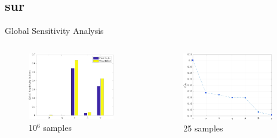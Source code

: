 \documentclass[xcolor={x11names,table},compress,svgnames,mathserif]{beamer}
\renewcommand{\(}{\begin{columns}}
\renewcommand{\)}{\end{columns}}
\newcommand{\<}[1]{\begin{column}{#1}}
\renewcommand{\>}{\end{column}}
\begin{document}

\subsection{sur}

\begin{frame}{Global Sensitivity Analysis}

\begin{columns}
\begin{column}{0.5\textwidth}
\begin{center}
\begin{figure}[htbp]
  \includegraphics[width=0.9\textwidth]{./Figures/PCE5D_gsa}
  \\ \scriptsize{10$^{6}$ samples}
  \end{figure}
\end{center}
\end{column}
\hspace{-9mm}
\begin{column}{0.5\textwidth}
\begin{center}
\begin{figure}[htbp]
  \includegraphics[width=0.9\textwidth]{./Figures/ub}
    \\ \scriptsize{25 samples}
  \end{figure}
\end{center}
\end{column}


\end{columns}
\end{frame}
\end{document}
